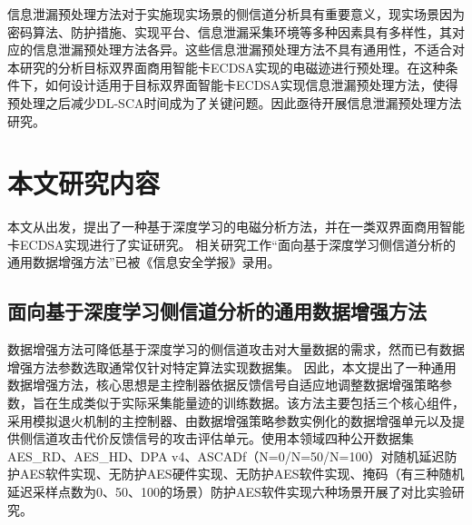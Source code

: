 {	信息泄漏预处理方法对于实施现实场景的侧信道分析具有重要意义，现实场景因为密码算法、防护措施、实现平台、信息泄漏采集环境等多种因素具有多样性，其对应的信息泄漏预处理方法各异。这些信息泄漏预处理方法不具有通用性，不适合对本研究的分析目标双界面商用智能卡ECDSA实现的电磁迹进行预处理。在这种条件下，如何设计适用于目标双界面智能卡ECDSA实现信息泄漏预处理方法，使得预处理之后减少DL-SCA时间成为了关键问题。因此亟待开展信息泄漏预处理方法研究。
	\section{本文研究内容}
	本文从\jiaodu 出发，提出了一种基于深度学习的电磁分析方法，并在一类双界面商用智能卡ECDSA实现进行了实证研究。%
	\ifshowcontent 相关研究工作“面向基于深度学习侧信道分析的通用数据增强方法”已被《信息安全学报》录用。\fi
	\subsection{面向基于深度学习侧信道分析的通用数据增强方法}
	数据增强方法可降低基于深度学习的侧信道攻击对大量数据的需求，然而已有数据增强方法参数选取通常仅针对特定算法实现数据集。
	因此，本文提出了一种通用数据增强方法，核心思想是主控制器依据反馈信号自适应地调整数据增强策略参数，旨在生成类似于实际采集能量迹的训练数据。该方法主要包括三个核心组件，采用模拟退火机制的主控制器、由数据增强策略参数实例化的数据增强单元以及提供侧信道攻击代价反馈信号的攻击评估单元。使用本领域四种公开数据集AES\_RD、AES\_HD、DPA v4、ASCADf（N=0/N=50/N=100）对随机延迟防护AES软件实现、无防护AES硬件实现、无防护AES软件实现、掩码（有三种随机延迟采样点数为0、50、100的场景）防护AES软件实现六种场景开展了对比实验研究。
	
}
